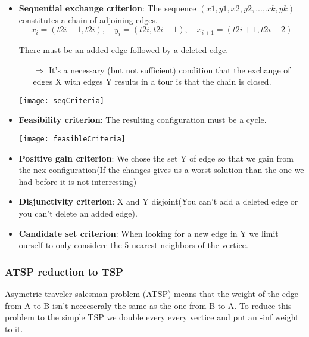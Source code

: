 \begin{itemize}
    \item \textbf{Sequential exchange criterion}: 
        The sequence $(x1, y1, x2, y2,..., xk, yk)$
        constitutes a chain of adjoining edges.
        $$x_i = (t2i -1, t2i), \quad y_i = (t2i, t2i+1), \quad x_{i+1} =
        (t2i+1, t2i+2)$$

        There must be an added edge followed by a deleted edge.

        \begin{itemize}
            \item[$\Rightarrow$] It's a necessary (but not sufficient) condition that the
        exchange of edges X with edges Y results in a tour is that the
        chain is closed.
    \end{itemize}

    \begin{center}
        \texttt{[image: seqCriteria]}
        \end{center}

\item \textbf{Feasibility criterion}: 
        The resulting configuration must be a cycle.

    \begin{center}
        \texttt{[image: feasibleCriteria]}
        \end{center}

    \item \textbf{Positive gain criterion}:
        We chose the set Y of edge so that we gain from the nex
        configuration(If the changes gives us a worst solution than the
        one we had before it is not interresting)

    \item \textbf{Disjunctivity criterion}:
        X and Y disjoint(You can't add a deleted edge or you can't
        delete an added edge).

    \item \textbf{Candidate set criterion}:
        When looking for a new edge in Y we limit ourself to only
        considere the 5 nearest neighbors of the vertice.

\end{itemize}

\subsubsection{ATSP reduction to TSP}
Asymetric traveler salesman problem (ATSP)
means that the weight of the edge from A to B isn't necceseraly the
same as the one from B to A. To reduce this problem to the simple TSP we
double every every vertice and put an -inf weight to it.


